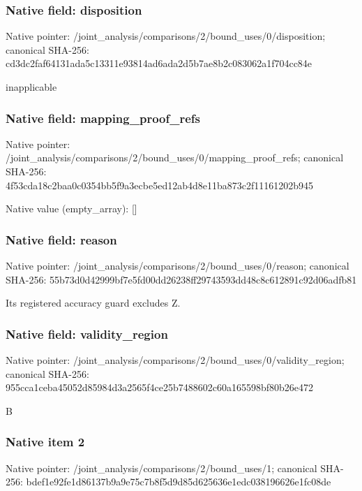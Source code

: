 \documentclass[10pt,a4paper]{article}
\begin{document}
\subsubsection{Native field: disposition}
Native pointer: /joint\_\allowbreak{}analysis/comparisons/2/bound\_\allowbreak{}uses/0/disposition; canonical SHA-256: cd3dc2faf64131ada5c13311e93814ad6ada2d5b7ae8b2c083062a1f704cc84e

\begingroup\raggedright\sloppy inapplicable\par\endgroup

\subsubsection{Native field: mapping\_\allowbreak{}proof\_\allowbreak{}refs}
Native pointer: /joint\_\allowbreak{}analysis/comparisons/2/bound\_\allowbreak{}uses/0/mapping\_\allowbreak{}proof\_\allowbreak{}refs; canonical SHA-256: 4f53cda18c2baa0c0354bb5f9a3ecbe5ed12ab4d8e11ba873c2f11161202b945

Native value (empty\_\allowbreak{}array): []

\subsubsection{Native field: reason}
Native pointer: /joint\_\allowbreak{}analysis/comparisons/2/bound\_\allowbreak{}uses/0/reason; canonical SHA-256: 55b73d0d42999bf7e5fd00dd26238ff29743593dd48c8c612891c92d06adfb81

\begingroup\raggedright\sloppy Its registered accuracy guard excludes Z.\par\endgroup

\subsubsection{Native field: validity\_\allowbreak{}region}
Native pointer: /joint\_\allowbreak{}analysis/comparisons/2/bound\_\allowbreak{}uses/0/validity\_\allowbreak{}region; canonical SHA-256: 955cca1ceba45052d85984d3a2565f4ce25b7488602c60a165598bf80b26e472

\begingroup\raggedright\sloppy B\par\endgroup

\subsubsection{Native item 2}
Native pointer: /joint\_\allowbreak{}analysis/comparisons/2/bound\_\allowbreak{}uses/1; canonical SHA-256: bdef1e92fe1d86137b9a9e75c7b8f5d9d85d625636e1edc038196626e1fc08de
\end{document}
